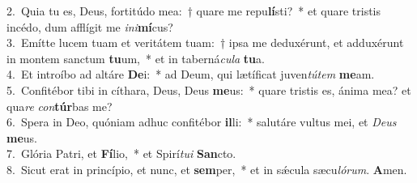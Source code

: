 {2.~}Quia tu es, Deus, fortitúdo mea:~† quare me repu\textbf{lí}sti?~* et quare tristis incédo, dum afflígit me \textit{i}\textit{ni}\textbf{mí}cus?\\
{3.~}Emítte lucem tuam et veritátem tuam:~† ipsa me deduxérunt, et adduxérunt in montem sanctum \textbf{tu}um,~* et in taberná\textit{cu}\textit{la} \textbf{tu}a.\\
{4.~}Et introíbo ad altáre \textbf{De}i:~* ad Deum, qui lætíficat juven\textit{tú}\textit{tem} \textbf{me}am.\\
{5.~}Confitébor tibi in cíthara, Deus, Deus \textbf{me}us:~* quare tristis es, ánima mea? et qua\textit{re} \textit{con}\textbf{túr}bas me?\\
{6.~}Spera in Deo, quóniam adhuc confitébor \textbf{il}li:~* salutáre vultus mei, et \textit{De}\textit{us} \textbf{me}us.\\
{7.~}Glória Patri, et \textbf{Fí}lio,~* et Spirí\textit{tu}\textit{i} \textbf{San}cto.\\
{8.~}Sicut erat in princípio, et nunc, et \textbf{sem}per,~* et in sǽcula sæcu\textit{ló}\textit{rum}. \textbf{A}men.\\
